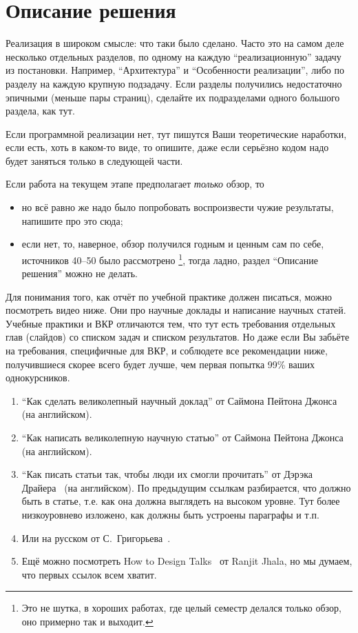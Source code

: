 
\section{Описание решения}
Реализация в широком смысле: что таки было сделано.
Часто это на самом деле несколько отдельных разделов, по одному на каждую \enquote{реализационную} задачу из постановки.
Например, \enquote{Архитектура} и \enquote{Особенности реализации}, либо по разделу на каждую крупную подзадачу.
Если разделы получились недостаточно эпичными (меньше пары страниц), сделайте их подразделами одного большого раздела, как тут.

Если программной реализации нет, тут пишутся Ваши теоретические наработки, если есть, хоть в каком-то виде, то опишите, даже если серьёзно кодом надо будет заняться только в следующей части.

Если работа на текущем этапе предполагает \emph{только} обзор, то
\begin{itemize}
    \item но всё равно же надо было попробовать воспроизвести чужие результаты, напишите про это сюда;
    \item если нет, то, наверное, обзор получился годным и ценным сам по себе, источников 40--50 было рассмотрено%
          \footnote{Это не шутка, в хороших работах, где целый семестр делался только обзор, оно примерно так и выходит.},
          тогда ладно, раздел \enquote{Описание решения} можно не делать.
\end{itemize}

Для понимания того, как отчёт по учебной практике должен писаться, можно посмотреть видео ниже.
Они про научные доклады и написание научных статей.
Учебные практики и ВКР отличаются тем, что тут есть требования отдельных глав (слайдов) со списком задач и списком результатов.
Но даже если Вы забьёте на требования, специфичные для ВКР, и соблюдете все рекомендации ниже, получившиеся скорее всего будет лучше, чем первая попытка 99\% ваших однокурсников.

\begin{enumerate}
    \item \enquote{Как сделать великолепный научный доклад} от Саймона Пейтона Джонса~\cite{SPJGreatTalk} (на английском).
    \item \enquote{Как написать великолепную научную статью} от Саймона Пейтона Джонса~\cite{SPJGreatPaper} (на английском).
    \item \enquote{Как писать статьи так, чтобы люди их смогли прочитать} от Дэрэка Драйера~\cite{DreyerYoutube2020} (на английском).
          По предыдущим ссылкам разбирается, что должно быть в статье, т.е. как она должна выгля\-деть на высоком уровне.
          Тут более низкоуровнево изложено, как должны быть устроены параграфы и т.п.
    \item Или на русском от С.~Григорьева~\cite{SemenI,SemenII}.
    \item Ещё можно посмотреть How to Design Talks~\cite{JhalaYoutube2020} от Ranjit Jhala, но мы думаем, что первых ссылок всем хватит.
\end{enumerate}

